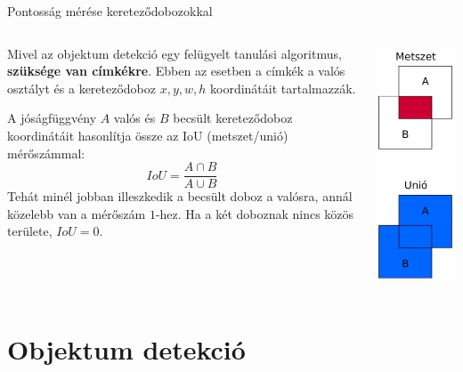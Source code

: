 \documentclass[english, aspectratio=169]{beamer}
\makeatletter
\let\origtableofcontents=\tableofcontents
\def\tableofcontents{\@ifnextchar[{\origtableofcontents}{\gobbletableofcontents}}
\def\gobbletableofcontents#1{\origtableofcontents}
\makeatother
\begin{document}
\begin{frame}{Pontosság mérése kereteződobozokkal}
\begin{columns}
\begin{column}{.7\textwidth}
Mivel az objektum detekció egy felügyelt tanulási algoritmus, \textbf{szüksége van címkékre}. Ebben az esetben a címkék a valós osztályt és a kereteződoboz $x,y,w,h$ koordinátáit tartalmazzák.\par\smallskip
A jóságfüggvény $A$ valós és $B$ becsült kereteződoboz koordinátáit hasonlítja össze az IoU (metszet/unió) mérőszámmal:
\[
IoU=\frac{A \cap B}{A \cup B}
\]
Tehát minél jobban illeszkedik a becsült doboz a valósra, annál közelebb van a mérőszám $1$-hez. Ha a két doboznak nincs közös területe, $IoU=0$.
\end{column}
\begin{column}{.3\textwidth}
\begin{center}
\includegraphics[height=7cm, width=7cm, keepaspectratio]{images/od_9.png}
\end{center}
\end{column}
\end{columns}
\end{frame}

\section{Objektum detekció}

\begin{frame}
\tableofcontents[currentsection]
\end{frame}
\end{document}
